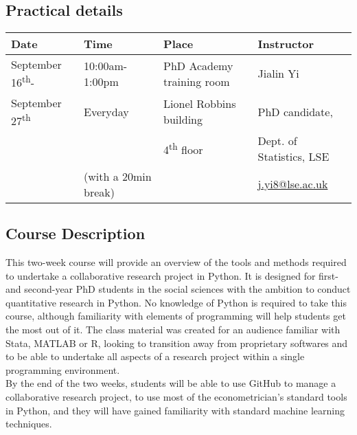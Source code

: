 \documentclass{amsart}
\theoremstyle{definition}
\theoremstyle{remark}
\numberwithin{equation}{section}
\begin{document}

\subsection*{Practical details}


\begin{center}
\begin{tabular}{| p{2.5cm} p{3.5cm} p{4.5cm} p{4.5cm} |} 
\hline
 \textbf{Date} & \textbf{Time} & \textbf{Place} & \textbf{Instructor} \\
\hline
 September 16\textsuperscript{th}- & 10:00am-1:00pm & PhD Academy training room & Jialin Yi \\
 September 27\textsuperscript{th} & Everyday & Lionel Robbins building & PhD candidate,  \\
     &   & 4\textsuperscript{th} floor &  Dept. of Statistics, LSE \\
    & (with a 20min break)  &  &  \href{
mailto:j.yi8@lse.ac.uk}{j.yi8@lse.ac.uk} \\
\hline
\end{tabular}
\end{center}

\subsection*{Course Description}

This two-week course will provide an overview of the tools and methods required to undertake a collaborative research project in Python. It is designed for first- and second-year PhD students in the social sciences with the ambition to conduct quantitative research in Python. No knowledge of Python is required to take this course, although familiarity with elements of programming will help students get the most out of it. The class material was created for an audience familiar with Stata, MATLAB or R, looking to transition away from proprietary softwares and to be able to undertake all aspects of a research project within a single programming environment. \\

By the end of the two weeks, students will be able to use GitHub to manage a collaborative research project, to use most of the econometrician's standard tools in Python, and they will have gained familiarity with standard machine learning techniques.
\end{document}
